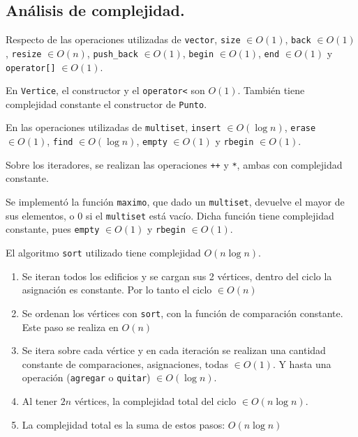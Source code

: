\subsection{Análisis de complejidad.}

\vspace*{0.3cm}

Respecto de las operaciones utilizadas de \verb|vector|, \verb|size| $\in O(1)$,
\verb|back| $\in O(1)$, \verb|resize| $\in O(n)$, \verb|push_back| $\in O(1)$,
\verb|begin| $\in O(1)$, \verb|end| $\in O(1)$ y \verb|operator[]| $\in O(1)$.

\noindent
En \verb|Vertice|, el constructor y el \verb|operator<| son $O(1)$. También
tiene complejidad constante el constructor de \verb|Punto|.

\noindent
En las operaciones utilizadas de \verb|multiset|, \verb|insert| $\in O(\log n)$,
\verb|erase| $\in O(1)$, \verb|find| $\in O(\log n)$, \verb|empty| $\in O(1)$ y
\verb|rbegin| $\in O(1)$.

\noindent
Sobre los iteradores, se realizan las operaciones \verb|++| y \verb|*|, ambas
con complejidad constante.

\noindent
Se implementó la función \verb|maximo|, que dado un \verb|multiset|, devuelve
el mayor de sus elementos, o 0 si el \verb|multiset| está vacío. Dicha función
tiene complejidad constante, pues \verb|empty| $\in O(1)$ y \verb|rbegin| $\in O(1)$.

\noindent
El algoritmo \verb|sort| utilizado tiene complejidad $O(n \log n)$.

\noindent

\begin{enumerate}
  \item Se iteran todos los edificios y se cargan sus 2 vértices, dentro
  del ciclo la asignación es constante. Por lo tanto el ciclo $\in O(n)$

  \item Se ordenan los vértices con \verb|sort|, con la función de comparación
  constante. Este paso se realiza en $O(n)$

  \item Se itera sobre cada vértice y en cada iteración se realizan una cantidad
  constante de comparaciones, asignaciones, todas $\in O(1)$. Y hasta una operación
  (\verb|agregar| o \verb|quitar|) $\in O(\log n)$.

  \item Al tener $2n$ vértices, la complejidad total del ciclo $\in O(n \log n)$.

  \item La complejidad total es la suma de estos pasos: $O(n \log n)$
\end{enumerate}



